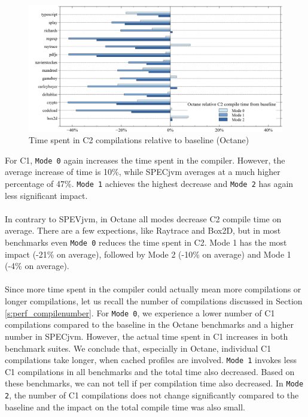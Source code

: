 \begin{figure}[ht]
  \begin{center}
    \centering
    \includegraphics[width=1.0\textwidth]{figures/octane_variation_compiletime_c2.png}
    \caption{Time spent in C2 compilations relative to baseline (Octane)}
    \label{f:octane_variation_compiletime_c2}
  \end{center}
\end{figure}
For C1, \texttt{Mode 0} again increases the time spent in the compiler. However, the average increase of time is 10\%, while SPECjvm averages at a much higher percentage of 47\%.
\texttt{Mode 1} achieves the highest decrease and \texttt{Mode 2} has again less significant impact.
\\\\
In contrary to SPEVjvm, in Octane all modes decrease C2 compile time on average. There are a few expections, like Raytrace and Box2D, but in most benchmarks even \texttt{Mode 0} reduces the time spent in C2. Mode 1 has the most impact (-21\% on average), followed by Mode 2 (-10\% on average) and Mode 1 (-4\% on average).
\\\\
Since more time spent in the compiler could actually mean more compilations or longer compilations, let us recall the number of compilations discussed in Section \ref{s:perf_compilenumber}. For \texttt{Mode 0}, we experience a lower number of C1 compilations compared to the baseline in the Octane benchmarks and a higher number in SPECjvm. However, the actual time spent in C1 increases in both benchmark suites. We conclude that, especially in Octane, individual C1 compilations take longer, when cached profiles are involved. \texttt{Mode 1} invokes less C1 compilations in all benchmarks and the total time also decreased. Based on these benchmarks, we can not tell if per compilation time also decreased. In \texttt{Mode 2}, the number of C1 compilations does not change significantly compared to the baseline and the impact on the total compile time was also small.
